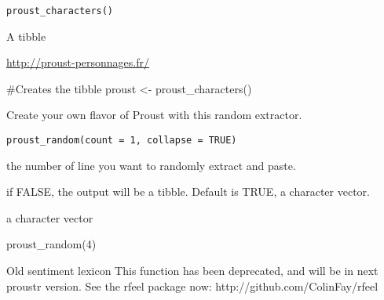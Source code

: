 \documentclass[a4paper]{book}
\begin{document}
%
\begin{Usage}
\begin{verbatim}
proust_characters()
\end{verbatim}
\end{Usage}
%
\begin{Value}
A tibble
\end{Value}
%
\begin{Source}\relax
\url{http://proust-personnages.fr/}
\end{Source}
%
\begin{Examples}
\begin{ExampleCode}

#Creates the tibble 
proust <- proust_characters()
 

\end{ExampleCode}
\end{Examples}
%
\begin{Description}\relax
Create your own flavor of Proust with this random extractor.
\end{Description}
%
\begin{Usage}
\begin{verbatim}
proust_random(count = 1, collapse = TRUE)
\end{verbatim}
\end{Usage}
%
\begin{Arguments}
\begin{ldescription}
\item[\code{count}] the number of line you want to randomly extract and paste.

\item[\code{collapse}] if FALSE, the output will be a tibble. Default is TRUE, a character vector.
\end{ldescription}
\end{Arguments}
%
\begin{Value}
a character vector
\end{Value}
%
\begin{Examples}
\begin{ExampleCode}
proust_random(4)
\end{ExampleCode}
\end{Examples}
%
\begin{Description}\relax
Old sentiment lexicon
This function has been deprecated, and will be in next proustr version.
See the rfeel package now: http://github.com/ColinFay/rfeel
\end{Description}
\end{document}
